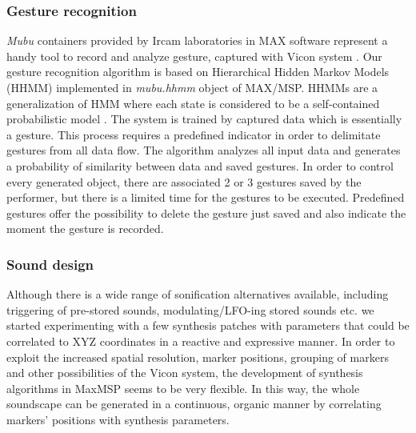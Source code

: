 \documentclass{nime-alternate}
\begin{document}
\subsubsection{Gesture recognition}

 \textit{Mubu} containers provided by Ircam laboratories in MAX software represent a handy tool to record and analyze gesture, captured with Vicon system \cite{mubu}. Our gesture recognition algorithm is based on Hierarchical Hidden Markov Models (HHMM) implemented in \textit{mubu.hhmm} object of MAX/MSP. HHMMs are a generalization of HMM where each state is considered to be a self-contained probabilistic model \cite{hhmm}. The system is trained by captured data which is essentially a gesture. This process requires a predefined indicator in order to delimitate gestures from all data flow. The algorithm analyzes all input data and generates a probability of similarity between data and saved gestures. In order to control every generated object, there are associated 2 or 3 gestures saved by the performer, but there is a limited time for the gestures to be executed. Predefined gestures offer the possibility to delete the gesture just saved and also indicate the moment the gesture is recorded.

\subsubsection{Sound design}

Although there is a wide range of sonification alternatives available, including triggering of pre-stored sounds, modulating/LFO-ing stored sounds etc. we started experimenting with a few synthesis patches with parameters that could be correlated to XYZ coordinates in a reactive and expressive manner.  In order to exploit the increased spatial resolution, marker positions, grouping of markers and other possibilities of the Vicon system, the development of synthesis  algorithms in MaxMSP seems to be very flexible.  In this way, the whole soundscape can be generated in a continuous, organic manner by correlating markers’ positions with synthesis parameters. 
\end{document}
